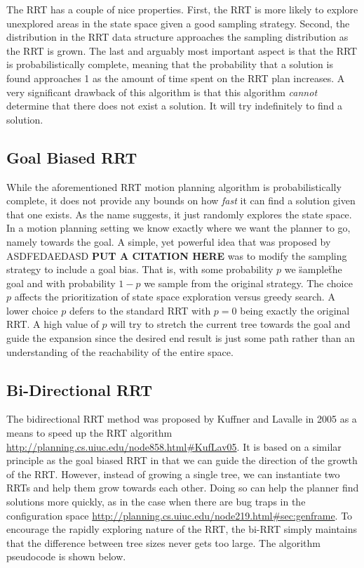 The RRT has a couple of nice properties. First, the RRT is more likely to explore unexplored areas in the state space given a good sampling strategy. Second, the distribution in the RRT data structure approaches the sampling distribution as the RRT is grown. The last and arguably most important aspect is that the RRT is probabilistically complete, meaning that the probability that a solution is found approaches 1 as the amount of time spent on the RRT plan increases. A very significant drawback of this algorithm is that this algorithm \emph{cannot} determine that there does not exist a solution. It will try indefinitely to find a solution.

\subsection{Goal Biased RRT} \label{planning:goal-bias}
While the aforementioned RRT motion planning algorithm is probabilistically complete, it does not provide any bounds on how \emph{fast} it can find a solution given that one exists. As the name suggests, it just randomly explores the state space. In a motion planning setting we know exactly where we want the planner to go, namely towards the goal. A simple, yet powerful idea that was proposed by ASDFEDAEDASD \textbf{PUT A CITATION HERE} was to modify the sampling strategy to include a goal bias. That is, with some probability $p$ we \"sample\" the goal and with probability $1-p$ we sample from the original strategy. The choice $p$ affects the prioritization of state space exploration versus greedy search. A lower choice $p$ defers to the standard RRT with $p=0$ being exactly the original RRT. A high value of $p$ will try to stretch the current tree towards the goal and guide the expansion since the desired end result is just some path rather than an understanding of the reachability of the entire space.

\subsection{Bi-Directional RRT} \label{planning:birrt}
The bidirectional RRT method was proposed by  Kuffner and Lavalle in 2005 as a means to speed up the RRT algorithm \url{http://planning.cs.uiuc.edu/node858.html#KufLav05}. It is based on a similar principle as the goal biased RRT in that we can guide the direction of the growth of the RRT. However, instead of growing a single tree, we can instantiate two RRTs and help them grow towards each other. Doing so can help the planner find solutions more quickly, as in the case when there are bug traps in the configuration space \url{http://planning.cs.uiuc.edu/node219.html#sec:genframe}. To encourage the rapidly exploring nature of the RRT, the bi-RRT simply maintains that the difference between tree sizes never gets too large. The algorithm pseudocode is shown below.

